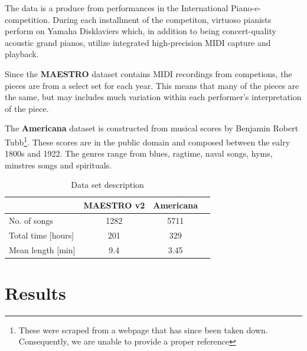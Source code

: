 \documentclass{IEEEtran}
\begin{document}
        The data is a produce from performances in the International Piano-e-competition.
        During each installment of the competiton, virtuoso pianists perform on Yamaha
        Disklaviers which, in addition to being concert-quality acoustic grand pianos,
        utilize integrated high-precision MIDI capture and playback.
            
        Since the \textbf{MAESTRO} dataset contains MIDI recordings from competions, 
        the pieces are from a select set for each year. This means that many of the 
        pieces are the same, but may includes much variation within each
        performer's interpretation of the piece. 

        The \textbf{Americana} dataset is constructed from musical scores by 
        Benjamin Robert Tubb\footnote{These were scraped from a webpage that has 
        since been taken down. Consequently, we are unable to provide a proper 
        reference}. These scores are in the public domain and composed between
        the ealry 1800s and 1922. The genres range from blues, ragtime, naval songs,
        hyms, minstres songs and spirituals. 
    
        \begin{table}
        \begin{center}
            \caption{Data set description \label{tab:data}}
            \begin{tabular}{l c c c} \hline
                & MAESTRO v2 & Americana \\ \hline\hline
            No. of songs & 1282 & 5711 \\ \hline
            Total time [hours] & 201 & 329 \\ \hline
            Mean length [min] & 9.4 & 3.45  \\ \hline
        \end{tabular}
        \end{center}
        \end{table}



    \section{Results}
\end{document}
